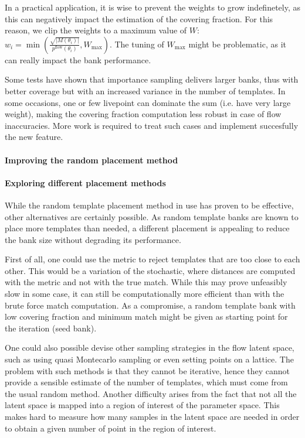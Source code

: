 \documentclass[twocolumn,showpacs,preprintnumbers,nofootinbib,prd,
superscriptaddress,10pt]{revtex4-2}
\begin{document}
In a practical application, it is wise to prevent the weights to grow indefinetely, as this can negatively impact the estimation of the covering fraction. For this reason, we clip the weights to a maximum value of $W$: ${w_i = \min\left(\frac{\sqrt{|M(\theta_i)|}}{p^\text{flow}(\theta_i)}, W_\text{max} \right)}$. The tuning of $W_\text{max}$ might be problematic, as it can really impact the bank performance.

Some tests have shown that importance sampling delivers larger banks, thus with better coverage but with an increased variance in the number of templates. In some occasions, one or few livepoint can dominate the sum (i.e. have very large weight), making the covering fraction computation less robust in case of flow inaccuracies.
More work is required to treat such cases and implement succesfully the new feature.

\paragraph{Improving the random placement method}

\paragraph{Exploring different placement methods}

While the random template placement method in use has proven to be effective, other alternatives are certainly possible. As random template banks are known to place more templates than needed, a different placement is appealing to reduce the bank size without degrading its performance.

First of all, one could use the metric to reject templates that are too close to each other. This would be a variation of the stochastic, where distances are computed with the metric and not with the true match. While this may prove unfeasibly slow in some case, it can still be computationally more efficient than with the brute force match computation. As a compromise, a random template bank with low covering fraction and minimum match might be given as starting point for the iteration (seed bank).

One could also possible devise other sampling strategies in the flow latent space, such as using quasi Montecarlo sampling or even setting points on a lattice.
The problem with such methods is that they cannot be iterative, hence they cannot provide a sensible estimate of the number of templates, which must come from the usual random method. Another difficulty arises from the fact that not all the latent space is mapped into a region of interest of the parameter space. This makes hard to measure how many samples in the latent space are needed in order to obtain a given number of point in the region of interest.
\end{document}
